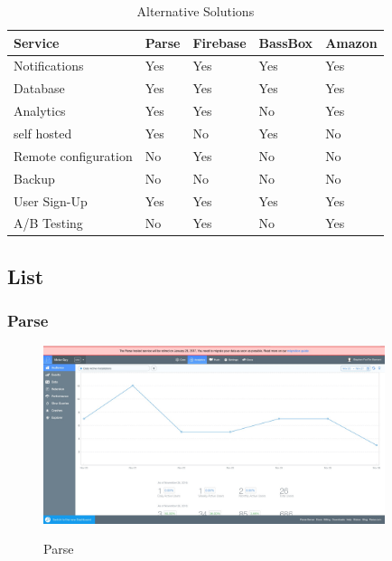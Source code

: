 \begin{table}[h]
\centering
\caption{Alternative Solutions}
\label{fig:overview}
\begin{tabular}{|l|l|l|l|l|}
\hline
\cellcolor{green!20}Service &\cellcolor{green!20}Parse &\cellcolor{green!20}Firebase &\cellcolor{green!20}BassBox &\cellcolor{green!20}Amazon \\ \hline
Notifications               & Yes                      & Yes                         & Yes                        & Yes\\ \hline
Database                    & Yes                      & Yes                         & Yes                        & Yes\\ \hline
Analytics                   & Yes                      & Yes                         & No                         & Yes\\ \hline
self hosted                 & Yes                      & No                          & Yes                        & No \\ \hline
Remote configuration        & No                       & Yes                         & No                         & No \\ \hline
Backup                      & No                       & No                          & No                         & No \\ \hline
User Sign-Up                & Yes                      & Yes                         & Yes                        & Yes\\ \hline
A/B Testing                 & No                       & Yes                         & No                         & Yes\\ \hline
\end{tabular}
\end{table}


\subsection{List}

\subsubsection{Parse}

\begin{figure}[!h]
    \caption{Parse}
    \centering
    \includegraphics[width=100mm]{images/parse}
    \label{fig:parse}
\end{figure}

